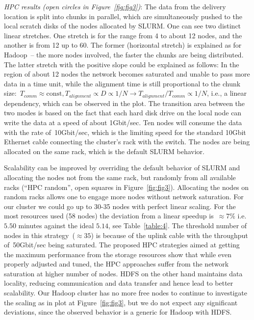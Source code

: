 \documentclass[10pt]{article}
\newcommand{\COMMENT}[1]{{\color{red} #1 }}
\begin{document}
\textit{HPC results (open circles in Figure~\ref{fig:fig3})}: The data from the delivery location is split into chunks in parallel, which are simultaneously pushed to the local scratch disks of the nodes allocated by SLURM. One can see two distinct linear stretches. One stretch is for the range from 4 to about 12 nodes, and the another is from 12 up to 60. The former (horizontal stretch) is explained as for Hadoop~-- the more nodes involved, the faster the chunks are being distributed. The latter stretch with the positive slope could be explained as follows: In the region of about 12 nodes the network becomes saturated
and unable to pass more data in a time unit, while the alignment time is still proportional to the chunk size:~$T_{comm}\approx\mbox{const}, T_{alignment}\propto D\propto 1/N \rightarrow T_{alignment}/T_{comm}\propto 1/N$, i.e., a linear dependency, which can be observed in the plot. 
The transition area between the two modes is based on the fact that each hard disk drive on the local node can write the data at a speed of about 1Gbit/sec. Ten nodes will consume the data with the rate of~10Gbit/sec, which is the limiting speed for the standard 10Gbit Ethernet cable connecting the cluster's rack with the switch. The nodes are being allocated on the same rack, which is the default SLURM behavior.

Scalability can be improved by overriding the default behavior of SLURM and allocating the nodes not from the same rack, but randomly from all available racks (``HPC random'', open squares in Figure~\ref{fig:fig3}). Allocating the nodes on random racks allows one to engage more nodes without network saturation. For our cluster we could go up to 30-35 nodes with perfect linear scaling. For the most resources used (58 nodes) the deviation from a linear speedup is~$\approx 7\%$ i.e. $5.50$ minutes against the ideal $5.14$, see Table~\ref{table:4}. The threshold number of nodes in this strategy~($\approx35$) is because of the uplink cable with the throughput of~50Gbit/sec being saturated. 
The proposed HPC strategies aimed at getting the maximum performance from the storage resources show that while even properly adjusted and tuned, the HPC approaches suffer from the network saturation at higher number of nodes.
HDFS on the other hand maintains data locality, reducing communication and data transfer and hence lead to better scalability.
Our Hadoop cluster has no more free nodes to continue to investigate the scaling as in plot at Figure~\ref{fig:fig3}, but we do not expect any significant deviations, since the observed behavior is a generic for Hadoop with HDFS\cite{lin2010, Hadoop:Guide}. 
\end{document}
